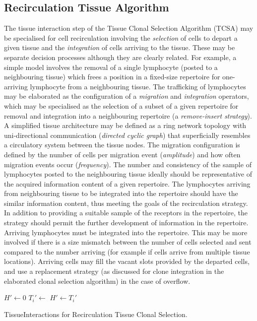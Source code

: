 \subsection{Recirculation Tissue Algorithm}
The tissue interaction step of the Tissue Clonal Selection Algorithm (TCSA) may be specialised for cell recirculation involving the \emph{selection} of cells to depart a given tissue and the \emph{integration} of cells arriving to the tissue. These may be separate decision processes although they are clearly related. For example, a simple model involves the removal of a single lymphocyte (posted to a neighbouring tissue) which frees a position in a fixed-size repertoire for one-arriving lymphocyte from a neighbouring tissue. The trafficking of lymphocytes may be elaborated as the configuration of a \emph{migration} and \emph{integration} operators, which may be specialised as the selection of a subset of a given repertoire for removal and integration into a neighbouring repertoire (a \emph{remove-insert strategy}). 
A simplified tissue architecture may be defined as a ring network topology with uni-directional communication (\emph{directed cyclic graph}) that superficially resembles a circulatory system between the tissue nodes. The migration configuration is defined by the number of cells per migration event (\emph{amplitude}) and how often migration events occur (\emph{frequency}). The number and consistency of the sample of lymphocytes posted to the neighbouring tissue ideally should be representative of the acquired information content of a given repertoire. The lymphocytes arriving from neighbouring tissue to be integrated into the repertoire should have the similar information content, thus meeting the goals of the recirculation strategy. In addition to providing a suitable sample of the receptors in the repertoire, the strategy should permit the further development of information in the repertoire. Arriving lymphocytes must be integrated into the repertoire. This may be more involved if there is a size mismatch between the number of cells selected and sent compared to the number arriving (for example if cells arrive from multiple tissue locations). Arriving cells may fill the vacant slots provided by the departed cells, and use a replacement strategy (as discussed for clone integration in the elaborated clonal selection algorithm) in the case of overflow.

\begin{algorithm}[ht]
  \SetLine
	
	$H\prime \leftarrow 0$\;
	{
		$T_{i}\prime \leftarrow$ \;
		$H\prime \leftarrow T_{i}\prime$\;
	}
	{
		{
			\;
		}
		\Else
		{
			\;
		}		
	}		
	\caption{TissueInteractions for Recirculation Tissue Clonal Selection.}
	\label{alg:tissues:algorithms:rtcsa}
\end{algorithm}

